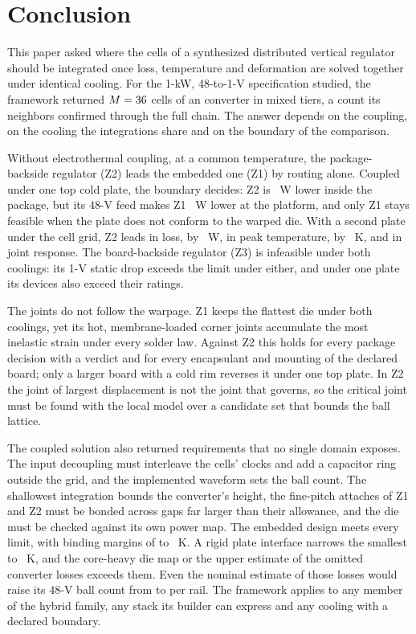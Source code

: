 \section{Conclusion}\label{sec:conclusion}

This paper asked where the cells of a synthesized distributed vertical regulator should be
integrated once loss, temperature and deformation are solved together under identical cooling.
For the 1-kW, 48-to-1-V specification studied, the framework returned $M = 36$ cells of an
\FrConvTopo{} converter in \FrDseOptTiersWord{} mixed tiers, a count its neighbors confirmed through
the full chain. The answer depends on the coupling, on the cooling the integrations share and on
the boundary of the comparison.

Without electrothermal coupling, at a common temperature, the package-backside regulator (Z2)
leads the embedded one (Z1) by routing alone. Coupled under one top cold plate, the boundary
decides: Z2 is \GapAZtwo~W lower inside the package, but its 48-V feed makes Z1 \WrPlatGapA~W
lower at the platform, and only Z1 stays feasible when the plate does not conform to the warped
die. With a second plate under the cell grid, Z2 leads in loss, by \GapBZtwo~W, in peak
temperature, by \dTmaxTierBZtwo~K, and in joint response. The board-backside regulator (Z3) is
infeasible under both coolings: its 1-V static drop exceeds the limit under either, and under one
plate its devices also exceed their ratings.

The joints do not follow the warpage. Z1 keeps the flattest die under both coolings, yet its hot,
membrane-loaded corner joints accumulate the most inelastic strain under every solder law. Against
Z2 this holds for every package decision with a verdict and for every encapsulant and mounting of
the declared board; only a larger board with a cold rim reverses it under one top plate. In Z2
the joint of largest displacement is not the joint that governs, so the critical joint must be
found with the local model over a candidate set that bounds the ball lattice.

The coupled solution also returned requirements that no single domain exposes. The input
decoupling must interleave the cells' clocks and add a capacitor ring outside the grid, and the
implemented waveform sets the ball count. The shallowest integration bounds the converter's
height, the fine-pitch attaches of Z1 and Z2 must be bonded across gaps far larger than their
allowance, and the die must be checked against its own power map. The embedded design meets every
limit, with binding margins of \WrRonMarginAZone{} to \WrDieMarginAZone~K. A rigid plate interface
narrows the smallest to \WrFbAZoneRonMargin~K, and the core-heavy die map or the upper estimate of
the omitted converter losses exceeds them. Even the nominal estimate of those losses would raise
its 48-V ball count from \WrBgaNZone{} to \OmitNomBgaNZone{} per rail. The framework applies to any
member of the hybrid family, any stack its builder can express and any cooling with a declared
boundary.
